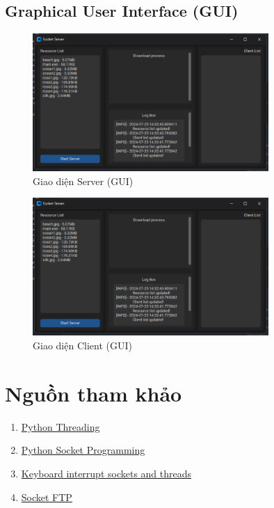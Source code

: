 \documentclass[a4paper,12pt]{report}
\begin{document}
\pagebreak
\subsection{Graphical User Interface (GUI)}
\begin{figure}[ht]
  \centering
  \includegraphics[width=0.8\textwidth]{Screenshots/server-gui.png}
  \caption{Giao diện Server (GUI)}\label{fig:server-gui}
\end{figure}
\begin{figure}[ht]
  \centering
  \includegraphics[width=0.8\textwidth]{Screenshots/server-gui.png}
  \caption{Giao diện Client (GUI)}\label{fig:client-gui}
\end{figure}

\pagebreak
\section{Nguồn tham khảo}
\begin{enumerate}
  \item \href{https://realpython.com/intro-to-python-threading}{Python Threading}
  \item \href{https://realpython.com/python-sockets/#handling-multiple-connections}{Python Socket Programming}
  \item \href{https://stackoverflow.com/questions/47847392/keyboard-interrupt-sockets-and-threads}{Keyboard interrupt sockets and threads}
  \item \href{https://github.com/hadis98/FTP-Client-Server-Python-Socket-Programming}{Socket FTP}
\end{enumerate}
\end{document}
